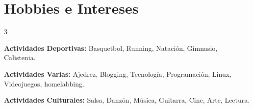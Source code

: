 \documentclass[10pt, letterpaper]{article}
\newenvironment{threecolentry}[3][]{
    \onecolentry
    \def\thirdColumn{#3}
    \setcolumnwidth{, \fill, 4.5 cm}
    \begin{paracol}{3}
    {\raggedright #2} \switchcolumn
}{
    \switchcolumn \raggedleft \thirdColumn
    \end{paracol}
    \endonecolentry
} %
\begin{document}
 \section{Hobbies e Intereses}

\begin{threecolentry}{
    \textbf{Actividades Deportivas:} Basquetbol, Running, Natación, Gimnasio, Calistenia.
}{
    \textbf{Actividades Culturales:} Salsa, Danzón, Música, Guitarra, Cine, Arte, Lectura. 
}{
    \textbf{Actividades Varias:} Ajedrez, Blogging, Tecnología, Programación, Linux, Videojuegos, homelabbing.
}
\end{threecolentry}
\end{document}
